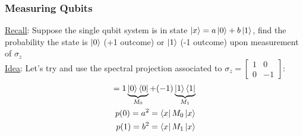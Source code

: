 \documentclass[12pt]{article}
\theoremstyle{plain}
\theoremstyle{nonumberplain}
\theoremstyle{plain}
\theoremstyle{nonumberplain}
\newcommand\1{{\bf 1}}
\newcommand{\bmat}[1]{\begin{bmatrix*} #1 \end{bmatrix*}} %
\newcommand{\<}{\left\langle}
\renewcommand{\>}{\right\rangle}
\begin{document}
\subsubsection{Measuring Qubits}
\underline{Recall}: Suppose the single qubit system is in state $\ket{x} = a\ket{0} + b\ket{1}$, find the probability the state is $\ket{0}$ (+1 outcome) or $\ket{1}$ (-1 outcome) upon measurement of $\sigma_z$\\
\underline{Idea}: Let's try and use the spectral projection associated to $\sigma_z = \bmat{1 &0\\ 0 &-1}$:
\begin{equation}
\begin{split}
= 1\underbrace{\ket{0}\bra{0}}_{M_0} + (-1)\underbrace{\ket{1}\bra{1}}_{M_1}\\
p(0) = a^2 = \bra{x}M_0\ket{x}\\
p(1) = b^2 = \bra{x}M_1\ket{x}\\
\end{split}
\end{equation}
\end{document}
